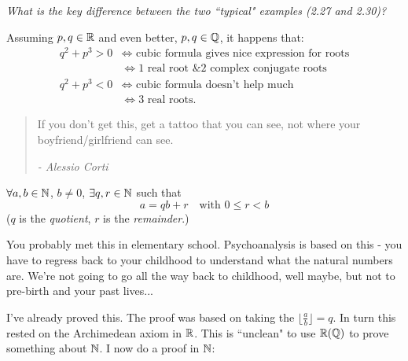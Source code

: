 \documentclass[twoside]{scrartcl}
\begin{document}
\emph{What is the key difference between the two ``typical" examples (2.27 and 2.30)? }

Assuming $p, q\in\mathbb{R}$ and even better, $p, q \in\mathbb{Q}$, it happens that: 
\[
\begin{aligned}
  q^2 + p^3 > 0 &\iff \text{ cubic formula gives nice expression for roots}\\
  &\iff 1 \mbox{ real root \& $2$ complex conjugate roots}\\[0.2cm]
  q^2 + p^3 < 0&\iff \mbox{ cubic formula doesn't help much}\\
  &\iff 3 \text{ real roots.} 
\end{aligned}
\]
















\begin{quote}
If you don't get this, get a tattoo that you can see, not where your boyfriend/girlfriend can see.  
\begin{flushright}
      \textit{ -  Alessio Corti}
       \end{flushright} 
\end{quote} 


\vspace*{5pt}

\begin{theorem} 
$\forall a,b \in\mathbb{N}$, $b \neq 0$, $\exists q, r\in\mathbb{N}$ such that 
\[a = qb + r \quad \text{with } 0 \leq r < b\]	
($q$ is the \emph{quotient}, $r$ is the \emph{remainder}.)
\end{theorem}\vspace*{5pt}


You probably met this in elementary school. Psychoanalysis is based on this - you have to regress back to your childhood to understand what the natural numbers are. We're not going to go all the way back to childhood, well maybe, but not to pre-birth and your past lives...\\

\begin{remark}
I've already proved this. The proof was based on taking the $\lfloor \frac{a}{b}\rfloor = q$. In turn this rested on the Archimedean axiom in $\mathbb{R}$. This is ``unclean" to use $\mathbb{R} (\mathbb{Q})$ to prove something about $\mathbb{N}$. I now do a proof in $\mathbb{N}$: 	
\end{remark}
\end{document}
